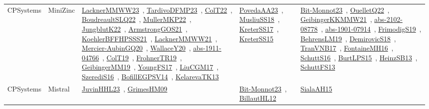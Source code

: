 {\begin{longtable}{lp{3cm}>{\raggedright\arraybackslash}p{6cm}>{\raggedright\arraybackslash}p{6cm}>{\raggedright\arraybackslash}p{8cm}}
CPSystems & MiniZinc & \href{works/LacknerMMWW23.pdf}{LacknerMMWW23}~\cite{LacknerMMWW23}, \href{works/TardivoDFMP23.pdf}{TardivoDFMP23}~\cite{TardivoDFMP23}, \href{works/ColT22.pdf}{ColT22}~\cite{ColT22}, \href{works/BoudreaultSLQ22.pdf}{BoudreaultSLQ22}~\cite{BoudreaultSLQ22}, \href{works/MullerMKP22.pdf}{MullerMKP22}~\cite{MullerMKP22}, \href{works/JungblutK22.pdf}{JungblutK22}~\cite{JungblutK22}, \href{works/ArmstrongGOS21.pdf}{ArmstrongGOS21}~\cite{ArmstrongGOS21}, \href{works/KoehlerBFFHPSSS21.pdf}{KoehlerBFFHPSSS21}~\cite{KoehlerBFFHPSSS21}, \href{works/LacknerMMWW21.pdf}{LacknerMMWW21}~\cite{LacknerMMWW21}, \href{works/Mercier-AubinGQ20.pdf}{Mercier-AubinGQ20}~\cite{Mercier-AubinGQ20}, \href{works/WallaceY20.pdf}{WallaceY20}~\cite{WallaceY20}, \href{works/abs-1911-04766.pdf}{abs-1911-04766}~\cite{abs-1911-04766}, \href{works/ColT19.pdf}{ColT19}~\cite{ColT19}, \href{works/FrohnerTR19.pdf}{FrohnerTR19}~\cite{FrohnerTR19}, \href{works/GeibingerMM19.pdf}{GeibingerMM19}~\cite{GeibingerMM19}, \href{works/YoungFS17.pdf}{YoungFS17}~\cite{YoungFS17}, \href{works/LiuCGM17.pdf}{LiuCGM17}~\cite{LiuCGM17}, \href{works/SzerediS16.pdf}{SzerediS16}~\cite{SzerediS16}, \href{works/BofillEGPSV14.pdf}{BofillEGPSV14}~\cite{BofillEGPSV14}, \href{works/KelarevaTK13.pdf}{KelarevaTK13}~\cite{KelarevaTK13} & \href{works/PovedaAA23.pdf}{PovedaAA23}~\cite{PovedaAA23}, \href{works/MusliuSS18.pdf}{MusliuSS18}~\cite{MusliuSS18}, \href{works/KreterSS17.pdf}{KreterSS17}~\cite{KreterSS17}, \href{works/KreterSS15.pdf}{KreterSS15}~\cite{KreterSS15} & \href{works/Bit-Monnot23.pdf}{Bit-Monnot23}~\cite{Bit-Monnot23}, \href{works/OuelletQ22.pdf}{OuelletQ22}~\cite{OuelletQ22}, \href{works/GeibingerKKMMW21.pdf}{GeibingerKKMMW21}~\cite{GeibingerKKMMW21}, \href{works/abs-2102-08778.pdf}{abs-2102-08778}~\cite{abs-2102-08778}, \href{works/abs-1901-07914.pdf}{abs-1901-07914}~\cite{abs-1901-07914}, \href{works/FrimodigS19.pdf}{FrimodigS19}~\cite{FrimodigS19}, \href{works/BehrensLM19.pdf}{BehrensLM19}~\cite{BehrensLM19}, \href{works/DemirovicS18.pdf}{DemirovicS18}~\cite{DemirovicS18}, \href{works/TranVNB17.pdf}{TranVNB17}~\cite{TranVNB17}, \href{works/FontaineMH16.pdf}{FontaineMH16}~\cite{FontaineMH16}, \href{works/SchuttS16.pdf}{SchuttS16}~\cite{SchuttS16}, \href{works/BurtLPS15.pdf}{BurtLPS15}~\cite{BurtLPS15}, \href{works/HeinzSB13.pdf}{HeinzSB13}~\cite{HeinzSB13}, \href{works/SchuttFS13.pdf}{SchuttFS13}~\cite{SchuttFS13}\\
CPSystems & Mistral & \href{works/JuvinHHL23.pdf}{JuvinHHL23}~\cite{JuvinHHL23}, \href{works/GrimesHM09.pdf}{GrimesHM09}~\cite{GrimesHM09} & \href{works/Bit-Monnot23.pdf}{Bit-Monnot23}~\cite{Bit-Monnot23}, \href{works/BillautHL12.pdf}{BillautHL12}~\cite{BillautHL12} & \href{works/SialaAH15.pdf}{SialaAH15}~\cite{SialaAH15}\\

\end{longtable}}
